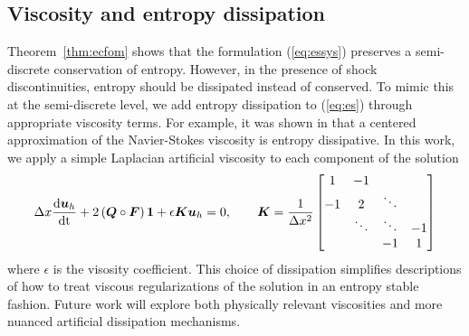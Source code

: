 \documentclass[review]{siamart171218}
\theoremstyle{assumption}
\newcommand{\td}[2]{\frac{{\rm d}#1}{{\rm d}{\rm #2}}}
\newcommand{\LRp}[1]{\left( #1 \right)}
\begin{document}
\subsection{Viscosity and entropy dissipation} 

Theorem~\ref{thm:ecfom} shows that the formulation (\ref{eq:essys}) preserves a semi-discrete conservation of entropy.  However, in the presence of shock discontinuities, entropy should be dissipated instead of conserved.  To mimic this at the semi-discrete level, we add entropy dissipation to (\ref{eq:es}) through appropriate viscosity terms.  For example, it was shown in \cite{tadmor2006entropy} that a centered approximation of the Navier-Stokes viscosity is entropy dissipative.  In this work, we apply a simple Laplacian artificial viscosity to each component of the solution \cite{upperman2019entropy}
\begin{equation}
\Delta x \td{\bm{u}_h}{t} + 2\LRp{{\bm{Q}}\circ \bm{F}}\bm{1} + \epsilon \bm{K}\bm{u}_h= 0, \qquad \bm{K} = \frac{1}{\Delta x^2} \begin{bmatrix}
1 & -1 & & \\
-1 & 2 & \ddots &\\
 & \ddots & \ddots & -1\\
 &  & -1& 1\\
\end{bmatrix}
\label{eq:esvisc}
\end{equation}
where $\epsilon$ is the visosity coefficient.  This choice of dissipation simplifies descriptions of how to treat viscous regularizations of the solution in an entropy stable fashion.  Future work will explore both physically relevant viscosities and more nuanced artificial dissipation mechanisms.  
\end{document}
